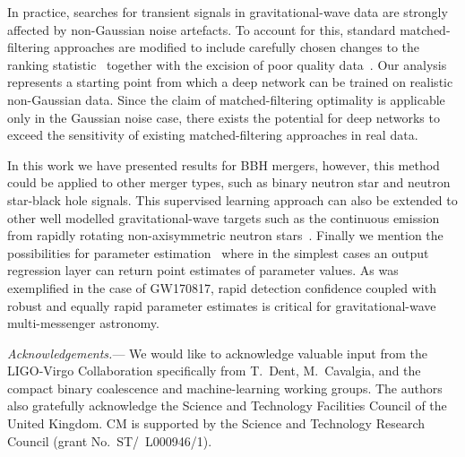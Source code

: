 \documentclass[%
showpacs,
 amsmath,amssymb,
 aps,
 twocolumn,
 prl,
 reprint,
floatfix,
]{revtex4-1}
\begin{document}
%
%
In practice, searches for transient signals in gravitational-wave data are
strongly affected by non-Gaussian noise artefacts. To account for this,
standard matched-filtering approaches are modified to include carefully chosen
changes to the ranking statistic~\cite{PhysRevD.71.062001,0004-637X-849-2-118}
together with the excision of poor quality data~\cite{1710.02185,
0264-9381-33-13-134001}. Our analysis represents a starting point from which a
deep network can be trained on realistic non-Gaussian data. Since the claim of
matched-filtering optimality is applicable only in the Gaussian noise case,
there exists the potential for deep networks to exceed the sensitivity of
existing matched-filtering approaches in real data.

%
%
In this work we have presented results for \ac{BBH} mergers, however, this
method could be applied to other merger types, such as binary neutron star and
neutron star-black hole signals. This supervised learning approach can also be
extended to other well modelled gravitational-wave targets such as the
continuous emission from rapidly rotating non-axisymmetric neutron
stars~\cite{1707.02669}. %
Finally we mention the possibilities for parameter
estimation~\cite{1701.00008} where in the simplest cases an output regression
layer can return point estimates of parameter values. As was exemplified in the
case of GW170817, rapid detection confidence coupled with robust and equally
rapid parameter estimates is critical for gravitational-wave multi-messenger
astronomy. 

%
%
\emph{Acknowledgements.}---
%
We would like to acknowledge valuable input from the LIGO-Virgo Collaboration
specifically from T.~Dent, M.~Cavalgia, and the compact binary coalescence and
machine-learning working groups. The authors also gratefully acknowledge the
Science and Technology Facilities Council of the United Kingdom. CM is
supported by the Science and Technology Research Council (grant
No.~ST/~L000946/1).
%




\end{document}
